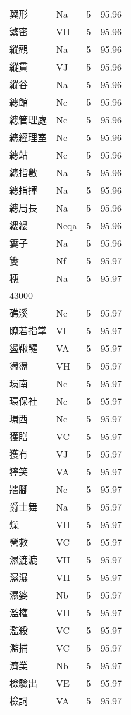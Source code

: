 \documentclass[twocolumn]{book}
\begin{document}
\begin{supertabular}{llrr}
翼形 & Na & 5 &  95.96\\
繁密 & VH & 5 &  95.96\\
縱觀 & Na & 5 &  95.96\\
縱貫 & VJ & 5 &  95.96\\
縱谷 & Na & 5 &  95.96\\
總館 & Nc & 5 &  95.96\\
總管理處 & Nc & 5 &  95.96\\
總經理室 & Nc & 5 &  95.96\\
總站 & Nc & 5 &  95.96\\
總指數 & Na & 5 &  95.96\\
總指揮 & Na & 5 &  95.96\\
總局長 & Na & 5 &  95.96\\
縷縷 & Neqa & 5 &  95.96\\
簍子 & Na & 5 &  95.96\\
簍 & Nf & 5 &  95.97\\
穗 & Na & 5 &  95.97\\
43000\\
礁溪 & Nc & 5 &  95.97\\
瞭若指掌 & VI & 5 &  95.97\\
盪鞦韆 & VA & 5 &  95.97\\
盪盪 & VH & 5 &  95.97\\
環南 & Nc & 5 &  95.97\\
環保社 & Nc & 5 &  95.97\\
環西 & Nc & 5 &  95.97\\
獲贈 & VC & 5 &  95.97\\
獲有 & VJ & 5 &  95.97\\
獰笑 & VA & 5 &  95.97\\
牆腳 & Nc & 5 &  95.97\\
爵士舞 & Na & 5 &  95.97\\
燥 & VH & 5 &  95.97\\
營救 & VC & 5 &  95.97\\
濕漉漉 & VH & 5 &  95.97\\
濕濕 & VH & 5 &  95.97\\
濕婆 & Nb & 5 &  95.97\\
濫權 & VH & 5 &  95.97\\
濫殺 & VC & 5 &  95.97\\
濫捕 & VC & 5 &  95.97\\
濟業 & Nb & 5 &  95.97\\
檢驗出 & VE & 5 &  95.97\\
檢詞 & VA & 5 &  95.97\\

\end{supertabular}
\end{document}
